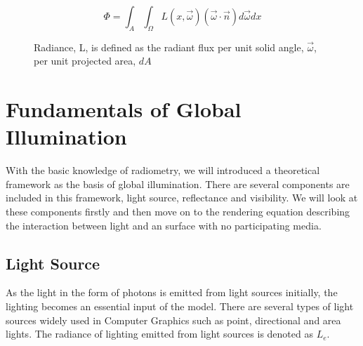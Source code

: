\begin{equation}
\Phi = \int_{A}\int_{\Omega}L(x, \overrightarrow{\omega})(\overrightarrow{\omega} \cdot \overrightarrow{n})d\overrightarrow{\omega}dx
\label{eq:flux_from_radiance}
\end{equation}

\begin{figure}[htp]
    \centering
    \renewcommand{\thefigure}{\thechapter.\arabic{figure}}
    \caption[Geometric setup of radiance and solid angle]{Radiance, L, is defined as the radiant flux per unit solid angle, \(\overrightarrow{\omega}\), per unit projected area, \(dA\)}
    \label{fig:radiance_solid_angle}
\end{figure}


\section{Fundamentals of Global Illumination}
With the basic knowledge of radiometry, we will introduced a theoretical framework as the basis of global illumination. There are several components are included in this framework, light source, reflectance and visibility. We will look at these components firstly and then move on to the rendering equation describing the interaction between light and an surface with no participating media.

\subsection{Light Source}
As the light in the form of photons is emitted from light sources initially, the lighting becomes an essential input of the model. There are several types of light sources widely used in Computer Graphics such as point, directional and area lights. The radiance of lighting emitted from light sources is denoted as \( L_{e} \).

